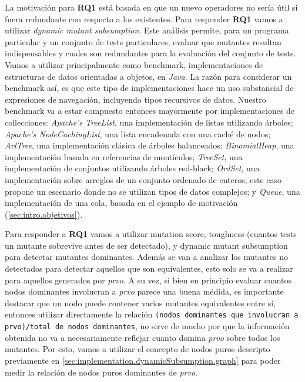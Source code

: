 La motivaci\'on para \textbf{RQ1} est\'a basada en que un nuevo operadores no ser\'ia \'util si fuera redundante con respecto a los existentes. Para responder \textbf{RQ1} vamos a utilizar \emph{dynamic mutant subsumption}. Este an\'alisis permite, para un programa particular y un conjunto de tests particulares, evaluar que mutantes resultan indispensables y cuales son redundantes para la evaluaci\'on del conjunto de tests. Vamos a utilizar principalmente como benchmark, implementaciones de estructuras de datos orientadas a objetos, en \emph{Java}. La raz\'on para considerar un benchmark as\'i, es que este tipo de implementaciones hace un uso substancial de expresiones de navegaci\'on, incluyendo tipos recursivos de datos. Nuestro benchmark va a estar compuesto entonces mayormente por implementaciones de collecciones:  \emph{Apache's TreeList}, una implementaci\'on de listas utilizando \'arboles; \emph{Apache's NodeCachingList}, una lista encadenada con una cach\'e de nodos; \emph{AvlTree}, una implementaci\'on cl\'asica de \'arboles balanceados; \emph{BinomialHeap}, una implementaci\'on basada en referencias de mont\'iculos; \emph{TreeSet}, una implementaci\'on de conjuntos utilizando \'arboles red-black; \emph{OrdSet}, una implementaci\'on sobre arreglos de un conjunto ordenado de enteros, este caso propone un escenario donde no se utilizan tipos de datos complejos; y \emph{Queue}, una implementaci\'on de una cola, basada en el ejemplo de motivaci\'on (\ref{sec:intro.objetivos}).

Para responder a \textbf{RQ1} vamos a utilizar mutation score, toughness (cuantos tests un mutante sobrevive antes de ser detectado), y dynamic mutant subsumption para detectar mutantes dominantes. Adem\'as se van a analizar los mutantes no detectados para detectar aquellos que son equivalentes, esto solo se va a realizar para aquellos generados por \emph{prvo}. A su vez, si bien en principio evaluar cuantos nodos dominantes involucran a \emph{prvo} parece una buena m\'edida, es importante destacar que un nodo puede contener varios mutantes equivalentes entre s\'i, entonces utilizar directamente la relaci\'on \texttt{(nodos dominantes que involucran a prvo)/total de nodos dominantes}, no sirve de mucho por que la informaci\'on obtenida no va a necesariamente reflejar cuanto domina \emph{prvo} sobre todos los mutantes. Por esto, vamos a utilizar el concepto de nodos puros descripto previamente en \ref{sec:implementation.dynamicSubsumption.graph} para poder medir la relaci\'on de nodos puros dominantes de \emph{prvo}.


